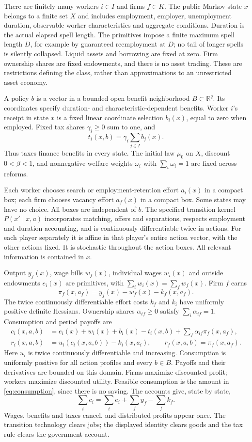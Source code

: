 \documentclass[11pt]{article}
\newcommand{\R}{\mathbb R}
\begin{document}
There are finitely many workers $i\in I$ and firms $f\in K$. The public Markov state $x$ belongs to a finite set $X$ and includes employment, employer, unemployment duration, observable worker characteristics and aggregate conditions. Duration is the actual elapsed spell length. The primitives impose a finite maximum spell length $D$, for example by guaranteed reemployment at $D$; no tail of longer spells is silently collapsed. Liquid assets and borrowing are fixed at zero. Firm ownership shares are fixed endowments, and there is no asset trading. These are restrictions defining the class, rather than approximations to an unrestricted asset economy.

A policy $b$ is a vector in a bounded open benefit neighborhood $B\subset\R^q$. Its coordinates specify duration- and characteristic-dependent benefits. Worker $i$'s receipt in state $x$ is a fixed linear coordinate selection $b_i(x)$, equal to zero when employed. Fixed tax shares $\gamma_i\ge0$ sum to one, and
\[
 t_i(x,b)=\gamma_i\sum_{j\in I}b_j(x).
\]
Thus taxes finance benefits in every state. The initial law $\mu_0$ on $X$, discount $0<\beta<1$, and nonnegative welfare weights $\omega_i$ with $\sum_i\omega_i=1$ are fixed across reforms.

Each worker chooses search or employment-retention effort $a_i(x)$ in a compact box; each firm chooses vacancy effort $a_f(x)$ in a compact box. Some states may have no choice. All boxes are independent of $b$. The specified transition kernel $P(x'\mid x,a)$ incorporates matching, offers and separations, respects employment and duration accounting, and is continuously differentiable twice in actions. For each player separately it is affine in that player's entire action vector, with the other actions fixed. It is stochastic throughout the action boxes. All relevant information is contained in $x$.

Output $y_f(x)$, wage bills $w_f(x)$, individual wages $w_i(x)$ and outside endowments $e_i(x)$ are primitives, with $\sum_i w_i(x)=\sum_f w_f(x)$. Firm $f$ earns
\[
 \pi_f(x,a_f)=y_f(x)-w_f(x)-k_f(x,a_f).
\]
The twice continuously differentiable effort costs $k_f$ and $k_i$ have uniformly positive definite Hessians. Ownership shares $\alpha_{if}\ge0$ satisfy $\sum_i\alpha_{if}=1$. Consumption and period payoffs are
\begin{align}
 c_i(x,a,b)&=e_i(x)+w_i(x)+b_i(x)-t_i(x,b)
                   +\sum_f\alpha_{if}\pi_f(x,a_f),\label{eq:consumption}\\
 r_i(x,a,b)&=u_i(c_i(x,a,b))-k_i(x,a_i),\qquad
 r_f(x,a,b)=\pi_f(x,a_f).\label{eq:flows}
\end{align}
Here $u_i$ is twice continuously differentiable and increasing. Consumption is uniformly positive for all action profiles and every $b\in B$. Payoffs and their derivatives are bounded on this domain. Firms maximize discounted profit; workers maximize discounted utility. Feasible consumption is the amount in \eqref{eq:consumption}, since there is no saving. The accounts give, state by state,
\[
 \sum_i c_i=\sum_i e_i+\sum_f y_f-\sum_f k_f.
\]
Wages, benefits and taxes cancel, and distributed profits appear once. The transition technology clears jobs; the displayed identity clears goods and the tax rule clears the government account.
\end{document}

